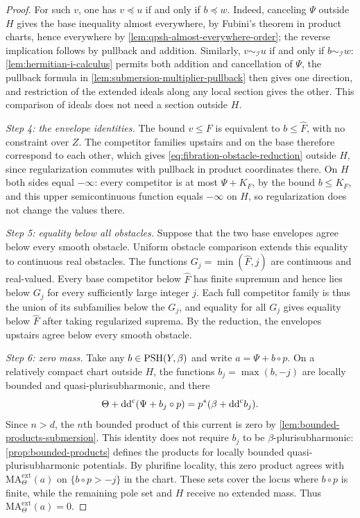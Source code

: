 \begin{proof}
For such $v$, one has $v\preceq u$ if and only if $b\preceq w$. Indeed, canceling $\Psi$ outside $H$ gives the base inequality almost everywhere, by Fubini's theorem in product charts, hence everywhere by \cref{lem:qpsh-almost-everywhere-order}; the reverse implication follows by pullback and addition. Similarly, $v\sim_{\mathcal I}u$ if and only if $b\sim_{\mathcal I}w$: \cref{lem:hermitian-i-calculus} permits both addition and cancellation of $\Psi$, the pullback formula in \cref{lem:submersion-multiplier-pullback} then gives one direction, and restriction of the extended ideals along any local section gives the other. This comparison of ideals does not need a section outside $H$.

\emph{Step 4: the envelope identities.} The bound $v\leq F$ is equivalent to $b\leq\widehat F$, with no constraint over $Z$. The competitor families upstairs and on the base therefore correspond to each other, which gives \eqref{eq:fibration-obstacle-reduction} outside $H$, since regularization commutes with pullback in product coordinates there. On $H$ both sides equal $-\infty$: every competitor is at most $\Psi+K_F$, by the bound $b\leq K_F$, and this upper semicontinuous function equals $-\infty$ on $H$, so regularization does not change the values there.

\emph{Step 5: equality below all obstacles.} Suppose that the two base envelopes agree below every smooth obstacle. Uniform obstacle comparison extends this equality to continuous real obstacles. The functions $G_j=\min(\widehat F,j)$ are continuous and real-valued. Every base competitor below $\widehat F$ has finite supremum and hence lies below $G_j$ for every sufficiently large integer $j$. Each full competitor family is thus the union of its subfamilies below the $G_j$, and equality for all $G_j$ gives equality below $\widehat F$ after taking regularized suprema. By the reduction, the envelopes upstairs agree below every smooth obstacle.

\emph{Step 6: zero mass.} Take any $b\in\mathrm{PSH}(Y,\beta)$ and write $a=\Psi+b\circ p$. On a relatively compact chart outside $H$, the functions $b_j=\max(b,-j)$ are locally bounded and quasi-plurisubharmonic, and there
\[
 \Theta+\mathrm{dd}^{\mathrm{c}}(\Psi+b_j\circ p)=p^*(\beta+\mathrm{dd}^{\mathrm{c}} b_j).
\]
Since $n>d$, the $n$th bounded product of this current is zero by \cref{lem:bounded-products-submersion}. This identity does not require $b_j$ to be $\beta$-plurisubharmonic: \cref{prop:bounded-products} defines the products for locally bounded quasi-plurisubharmonic potentials. By plurifine locality, this zero product agrees with $\mathrm{MA}^{\mathrm{ext}}_\Theta(a)$ on $\{b\circ p>-j\}$ in the chart. These sets cover the locus where $b\circ p$ is finite, while the remaining pole set and $H$ receive no extended mass. Thus $\mathrm{MA}^{\mathrm{ext}}_\Theta(a)=0$.


\end{proof}
